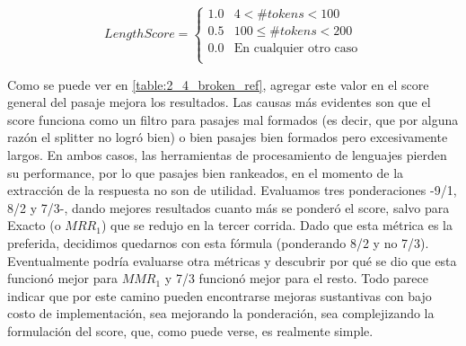 \begin{equation*}
    LengthScore = \begin{cases}
               1.0     & 4 <   \#tokens < 100\\
               0.5     & 100 \leq \#tokens < 200 \\
               0.0     & \text{En cualquier otro caso}\\
           \end{cases}
\end{equation*}


Como se puede ver en \ref{table:2_4_broken_ref}, agregar este valor en el score general del pasaje mejora los resultados. Las causas más evidentes son que el score funciona como un filtro para pasajes mal formados (es decir, que por alguna razón el splitter no logró  bien) o bien pasajes bien formados pero excesivamente largos. En ambos casos, las herramientas de procesamiento de lenguajes pierden su performance, por lo que pasajes bien rankeados, en el momento de la extracción de la respuesta no son de utilidad. Evaluamos tres ponderaciones -9/1, 8/2 y 7/3-, dando mejores resultados cuanto más se ponderó el score, salvo para Exacto (o $MRR_1$) que se redujo en la tercer corrida. Dado que esta métrica es la preferida, decidimos quedarnos con esta fórmula (ponderando 8/2 y no 7/3). Eventualmente podría evaluarse otra métricas y descubrir por qué se dio que esta funcionó mejor para $MMR_1$ y 7/3 funcionó mejor para el resto. Todo parece indicar que por este camino pueden encontrarse mejoras sustantivas con bajo costo de implementación, sea mejorando la ponderación, sea complejizando la formulación del score, que, como puede verse, es realmente simple.


